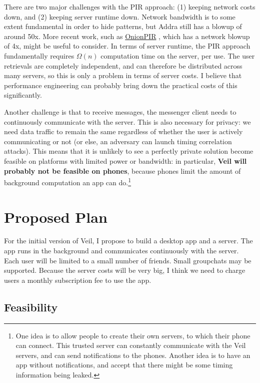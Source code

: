 \documentclass[sigconf, nonacm, balance=false, natbib=false, screen]{acmart}
\begin{document}
There are two major challenges with the PIR approach: (1) keeping network costs down, and (2) keeping server runtime down. Network bandwidth is to some extent fundamental in order to hide patterns, but Addra still has a blowup of around 50x. More recent work, such as \href{https://dl.acm.org/doi/abs/10.1145/3460120.3485381}{OnionPIR} \cite{mughees2021onionpir}, which has a network blowup of 4x, might be useful to consider. In terms of server runtime, the PIR approach fundamentally requires $\Omega(n)$ computation time on the server, per use. The user retrievals are completely independent, and can therefore be distributed across many servers, so this is only a problem in terms of server costs. I believe that performance engineering can probably bring down the practical costs of this significantly.

Another challenge is that to receive messages, the messenger client needs to continuously communicate with the server. This is also necessary for privacy: we need data traffic to remain the same regardless of whether the user is actively communicating or not (or else, an adversary can launch timing correlation attacks). This means that it is unlikely to see a perfectly private solution become feasible on platforms with limited power or bandwidth: in particular, \textbf{Veil will probably not be feasible on phones}, because phones limit the amount of background computation an app can do.\footnote{One idea is to allow people to create their own servers, to which their phone can connect. This trusted server can constantly communicate with the Veil servers, and can send notifications to the phones. Another idea is to have an app without notifications, and accept that there might be some timing information being leaked.}

\section{Proposed Plan}

For the initial version of Veil, I propose to build a desktop app and a server. The app runs in the background and communicates continuously with the server. Each user will be limited to a small number of friends. Small groupchats may be supported. Because the server costs will be very big, I think we need to charge users a monthly subscription fee to use the app.

\subsection{Feasibility}
\end{document}
